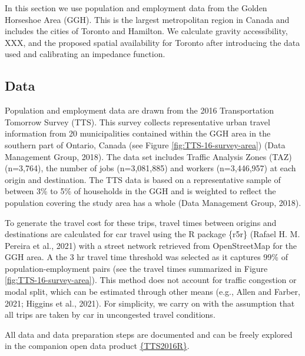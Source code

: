 \documentclass[]{elsarticle} %
\begin{document}
In this section we use population and employment data from the Golden
Horseshoe Area (GGH). This is the largest metropolitan region in Canada
and includes the cities of Toronto and Hamilton. We calculate gravity
accessibility, XXX, and the proposed spatial availability for Toronto
after introducing the data used and calibrating an impedance function.

\hypertarget{data}{%
\subsection{Data}\label{data}}

Population and employment data are drawn from the 2016 Transportation
Tomorrow Survey (TTS). This survey collects representative urban travel
information from 20 municipalities contained within the GGH area in the
southern part of Ontario, Canada (see Figure
\ref{fig:TTS-16-survey-area}) (Data Management Group, 2018). The data
set includes Traffic Analysis Zones (TAZ) (n=3,764), the number of jobs
(n=3,081,885) and workers (n=3,446,957) at each origin and destination.
The TTS data is based on a representative sample of between 3\% to 5\%
of households in the GGH and is weighted to reflect the population
covering the study area has a whole (Data Management Group, 2018).

To generate the travel cost for these trips, travel times between
origins and destinations are calculated for car travel using the R
package \{r5r\} (Rafael H. M. Pereira et al., 2021) with a street
network retrieved from OpenStreetMap for the GGH area. A the 3 hr travel
time threshold was selected as it captures 99\% of population-employment
pairs (see the travel times summarized in Figure
\ref{fig:TTS-16-survey-area}). This method does not account for traffic
congestion or modal split, which can be estimated through other means
(e.g., Allen and Farber, 2021; Higgins et al., 2021). For simplicity, we
carry on with the assumption that all trips are taken by car in
uncongested travel conditions.

All data and data preparation steps are documented and can be freely
explored in the companion open data product
\href{https://github.com/soukhova/TTS2016R}{\{TTS2016R\}}.
\end{document}
